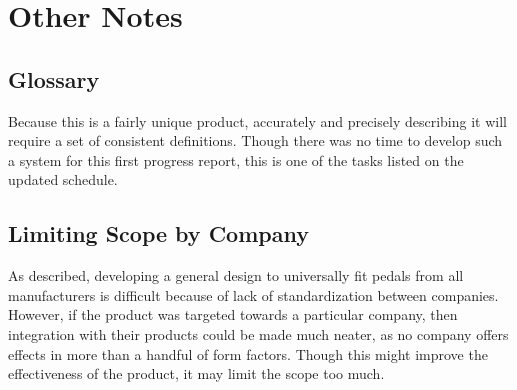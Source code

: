 \documentclass{article}
\begin{document}
\section{Other Notes}

	\subsection{Glossary}
	Because this is a fairly unique product, accurately and precisely describing it will require a set of consistent definitions.  Though there was no time to develop such a system for this first progress report, this is one of the tasks listed on the updated schedule.  

	\subsection{Limiting Scope by Company}
	As described, developing a general design to universally fit pedals from all manufacturers is difficult because of lack of standardization between companies.  However, if the product was targeted towards a particular company, then integration with their products could be made much neater, as no company offers effects in more than a handful of form factors.  Though this might improve the effectiveness of the product, it may limit the scope too much.


\newpage


\end{document}
